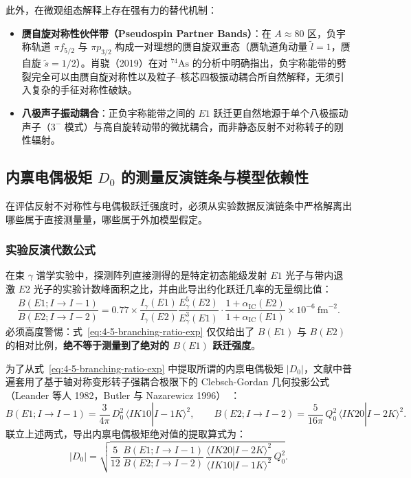 此外，在微观组态解释上存在强有力的替代机制：
\begin{itemize}
\item \textbf{赝自旋对称性伙伴带（Pseudospin Partner Bands）}：在 $A\approx 80$ 区，负宇称轨道 $\pi f_{5/2}$ 与 $\pi p_{3/2}$ 构成一对理想的赝自旋双重态（赝轨道角动量 $\tilde{l}=1$，赝自旋 $\tilde{s}=1/2$）。肖骁（2019）在对 $^{74}\mathrm{As}$ 的分析中明确指出，负宇称能带的劈裂完全可以由赝自旋对称性以及粒子--核芯四极振动耦合所自然解释，无须引入复杂的手征对称性破缺。
\item \textbf{八极声子振动耦合}：正负宇称能带之间的 $E1$ 跃迁更自然地源于单个八极振动声子（$3^-$ 模式）与高自旋转动带的微扰耦合，而非静态反射不对称转子的刚性辐射。
\end{itemize}

\subsection{内禀电偶极矩 $D_0$ 的测量反演链条与模型依赖性}\label{sec:4-5-5}

在评估反射不对称性与电偶极跃迁强度时，必须从实验数据反演链条中严格解离出哪些属于直接测量量，哪些属于外加模型假定。

\subsubsection{实验反演代数公式}

在束 $\gamma$ 谱学实验中，探测阵列直接测得的是特定初态能级发射 $E1$ 光子与带内退激 $E2$ 光子的实验计数峰面积之比，并由此导出约化跃迁几率的无量纲比值：
\begin{equation}\label{eq:4-5-branching-ratio-exp}
\frac{B(E1; I \to I-1)}{B(E2; I \to I-2)} = 0.77 \times \frac{I_\gamma(E1)}{I_\gamma(E2)} \frac{E_\gamma^5(E2)}{E_\gamma^3(E1)} \cdot \frac{1 + \alpha_{\mathrm{IC}}(E2)}{1 + \alpha_{\mathrm{IC}}(E1)} \times 10^{-6}\ \mathrm{fm}^{-2}.
\end{equation}
必须高度警惕：式~\eqref{eq:4-5-branching-ratio-exp} 仅仅给出了 $B(E1)$ 与 $B(E2)$ 的相对比例，\textbf{绝不等于测量到了绝对的 $B(E1)$ 跃迁强度}。

为了从式~\eqref{eq:4-5-branching-ratio-exp} 中提取所谓的内禀电偶极矩 $|D_0|$，文献中普遍套用了基于轴对称变形转子强耦合极限下的 Clebsch-Gordan 几何投影公式（Leander 等人 1982，Butler 与 Nazarewicz 1996）~\cite{butler-1996-octupole-shapes}：
\begin{equation}\label{eq:4-5-cg-formula}
B(E1; I \to I-1) = \frac{3}{4\pi}\,D_0^2\,\langle I K 1 0 | I-1 K \rangle^2 , \qquad
B(E2; I \to I-2) = \frac{5}{16\pi}\,Q_0^2\,\langle I K 2 0 | I-2 K \rangle^2 .
\end{equation}
联立上述两式，导出内禀电偶极矩绝对值的提取算式为：
\begin{equation}\label{eq:4-5-d0-derived}
|D_0| = \sqrt{\frac{5}{12}\,\frac{B(E1; I \to I-1)}{B(E2; I \to I-2)}\,\frac{\langle I K 2 0 | I-2 K \rangle^2}{\langle I K 1 0 | I-1 K \rangle^2}\,Q_0^2} .
\end{equation}

